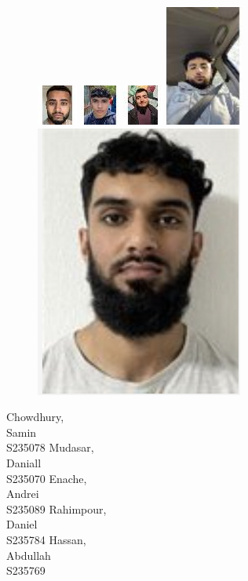 \documentclass{article}
\begin{document}
\begin{figure} [H]
    \includegraphics[width=.20\textwidth]{Samin.png}\hfill
    \includegraphics[width=.20\textwidth]{Daniall.png}\hfill
    \includegraphics[width=.20\textwidth]{Andrei.png}\hfill
    \includegraphics[width=.20\textwidth]{Daniel.png}\hfill
    \includegraphics[width=.20\textwidth]{Abdullah.png}
\end{figure}
\begin{multicols}{5}
Chowdhury, \\
Samin \\
S235078
\vfill\null
\columnbreak
Mudasar, \\
Daniall \\
S235070
\vfill\null
\columnbreak
Enache, \\
Andrei \\
S235089
\vfill\null
\columnbreak
Rahimpour, \\
Daniel \\
S235784
\vfill\null
\columnbreak
Hassan, \\
Abdullah \\
S235769
\vfill\null
\end{multicols}
\end{document}
